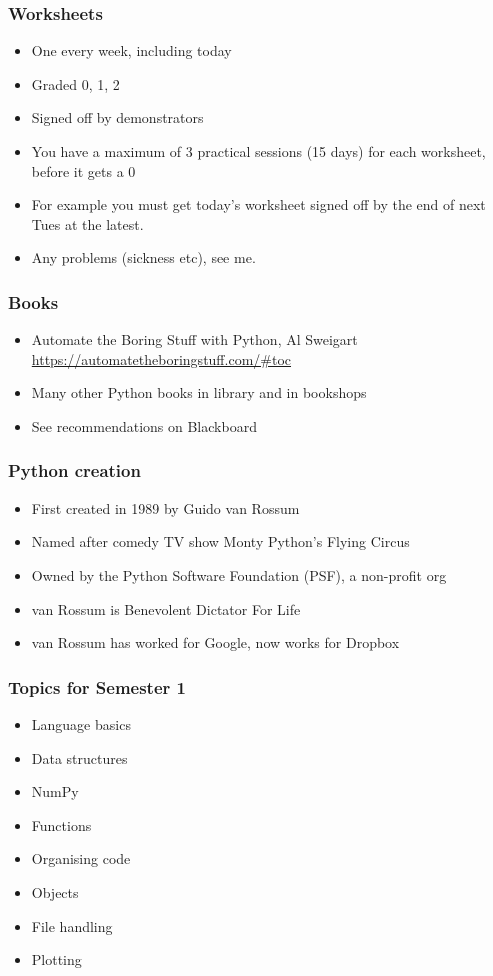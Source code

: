 \documentclass{beamer}
\begin{document}
\begin{frame}
\frametitle{Worksheets}
\begin{itemize}
\item One every week, including today
\item Graded 0, 1, 2
\item Signed off by demonstrators
\item You have a maximum of 3 practical sessions (15 days) for each worksheet, before it gets a 0
\item For example you must get today's worksheet signed off by the end
  of next Tues at the latest.
\item Any problems (sickness etc), see me.
\end{itemize}
\end{frame}


\begin{frame}
\frametitle{Books}
\begin{itemize}
\item Automate the Boring Stuff with Python, Al Sweigart 
    \url{https://automatetheboringstuff.com/\#toc}
\item Many other Python books in library and in bookshops
\item See recommendations on Blackboard
\end{itemize}
\end{frame}

\begin{frame}
\frametitle{Python creation}
\begin{itemize}
\item First created in 1989 by Guido van Rossum
\item Named after comedy TV show Monty Python's Flying Circus
\item Owned by the Python Software Foundation (PSF), a non-profit org
\item van Rossum is Benevolent Dictator For Life
\item van Rossum has worked for Google, now works for Dropbox
\end{itemize}
\end{frame}



\begin{frame}
\frametitle{Topics for Semester 1}
\begin{itemize}
\item Language basics
\item Data structures
\item NumPy
\item Functions
\item Organising code
\item Objects
\item File handling
\item Plotting
\end{itemize}
\end{frame}
\end{document}

